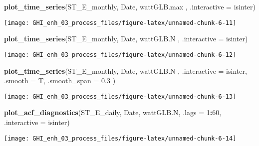\documentclass[
  10pt,
  a4paper,oneside]{article}
\newenvironment{Shaded}{\begin{snugshade}}{\end{snugshade}}
\newcommand{\AttributeTok}[1]{\textcolor[rgb]{0.13,0.29,0.53}{#1}}
\newcommand{\DecValTok}[1]{\textcolor[rgb]{0.00,0.00,0.81}{#1}}
\newcommand{\FloatTok}[1]{\textcolor[rgb]{0.00,0.00,0.81}{#1}}
\newcommand{\FunctionTok}[1]{\textcolor[rgb]{0.13,0.29,0.53}{\textbf{#1}}}
\newcommand{\NormalTok}[1]{#1}
\newcommand{\SpecialCharTok}[1]{\textcolor[rgb]{0.81,0.36,0.00}{\textbf{#1}}}
\begin{document}
\begin{Shaded}
\begin{Highlighting}[]
\FunctionTok{plot\_time\_series}\NormalTok{(ST\_E\_monthly, Date, wattGLB.max , }\AttributeTok{.interactive =}\NormalTok{ isinter)}
\end{Highlighting}
\end{Shaded}

\begin{center}\texttt{[image: GHI\_enh\_03\_process\_files/figure-latex/unnamed-chunk-6-11]} \end{center}

\begin{Shaded}
\begin{Highlighting}[]
\FunctionTok{plot\_time\_series}\NormalTok{(ST\_E\_monthly, Date, wattGLB.N   , }\AttributeTok{.interactive =}\NormalTok{ isinter)}
\end{Highlighting}
\end{Shaded}

\begin{center}\texttt{[image: GHI\_enh\_03\_process\_files/figure-latex/unnamed-chunk-6-12]} \end{center}

\begin{Shaded}
\begin{Highlighting}[]
\FunctionTok{plot\_time\_series}\NormalTok{(ST\_E\_monthly, Date, wattGLB.N   , }\AttributeTok{.interactive =}\NormalTok{ isinter, }\AttributeTok{.smooth =}\NormalTok{ T, }\AttributeTok{.smooth\_span =} \FloatTok{0.3}\NormalTok{ )}
\end{Highlighting}
\end{Shaded}

\begin{center}\texttt{[image: GHI\_enh\_03\_process\_files/figure-latex/unnamed-chunk-6-13]} \end{center}

\begin{Shaded}
\begin{Highlighting}[]
\FunctionTok{plot\_acf\_diagnostics}\NormalTok{(ST\_E\_daily, Date, wattGLB.N, }\AttributeTok{.lags =} \DecValTok{1}\SpecialCharTok{:}\DecValTok{60}\NormalTok{, }\AttributeTok{.interactive =}\NormalTok{ isinter)}
\end{Highlighting}
\end{Shaded}

\begin{center}\texttt{[image: GHI\_enh\_03\_process\_files/figure-latex/unnamed-chunk-6-14]} \end{center}
\end{document}
